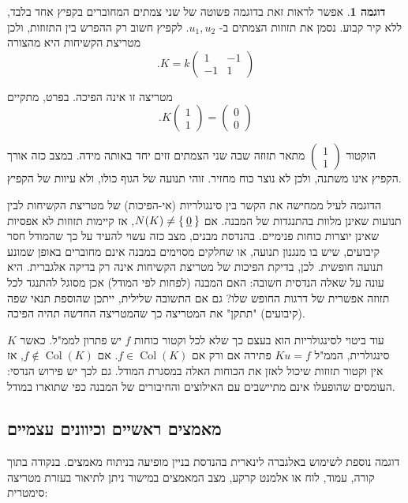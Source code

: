 \documentclass[12pt]{report}
\theoremstyle{plain}
\theoremstyle{definition}
\newtheorem{example}{דוגמה}[chapter]
\newcommand{\0}{\mathbf{0}}
\DeclareMathOperator{\Col}{Col}
\begin{document}
\begin{example}
אפשר לראות זאת בדוגמה פשוטה של שני צמתים המחוברים בקפיץ אחד בלבד, ללא קיר קבוע.
נסמן את תזוזות הצמתים ב-
$u_1,u_2$.
לקפיץ חשוב רק ההפרש בין התזוזות, ולכן מטריצת הקשיחות היא מהצורה
$$
.K =
k
\begin{pmatrix}
1 & -1 \\
-1 & 1
\end{pmatrix}
$$

מטריצה זו אינה הפיכה. בפרט, מתקיים
$$
.K
\begin{pmatrix}
1 \\
1
\end{pmatrix}
=
\begin{pmatrix}
0 \\
0
\end{pmatrix}
$$

הוקטור
$
\begin{pmatrix}
1 \\
1
\end{pmatrix}
$
מתאר תזוזה שבה שני הצמתים זזים יחד באותה מידה.
במצב כזה אורך הקפיץ אינו משתנה, ולכן לא נוצר כוח מחזיר.
זוהי תנועה של הגוף כולו, ולא עיוות של הקפיץ.
\end{example}

הדוגמה לעיל ממחישה את הקשר בין סינגולריות (אי-הפיכות) של מטריצת הקשיחות לבין תנועות שאינן מלוות בהתנגדות של המבנה.
אם
$N(K) \neq \Set{\underline{0}}$,
אז קיימות תזוזות לא אפסיות שאינן יוצרות כוחות פנימיים.
בהנדסת מבנים, מצב כזה עשוי להעיד על כך שהמודל חסר קיבועים, שיש בו מנגנון תנועה, או שחלקים מסוימים במבנה אינם מחוברים באופן שמונע תנועה חופשית. לכן, בדיקת הפיכות של מטריצת הקשיחות אינה רק בדיקה אלגברית. היא עונה על שאלה הנדסית חשובה:
האם המבנה (לפחות לפי המודל) אכן מסוגל להתנגד לכל תזוזה אפשרית של דרגות החופש שלו? גם אם התשובה שלילית, ייתכן שהוספת תנאי שפה (קיבועים) "תתקן" את המטריצה כך שהמטריצה החדשה תהיה הפיכה.

עוד ביטוי לסינגולריות הוא בעצם כך שלא לכל וקטור כוחות
$f$
יש פתרון לממ"ל.
כאשר
$K$
סינגולרית, הממ"ל
$Ku=f$
פתירה אם ורק אם
$f\in\Col(K)$.
אם
$f\notin\Col(K)$,
אז אין וקטור תזוזות שיכול לאזן את הכוחות האלה במסגרת המודל.
גם לכך יש פירוש הנדסי:
העומסים שהופעלו אינם מתיישבים עם האילוצים והחיבורים של המבנה כפי שתוארו במודל.

\subsection*{מאמצים ראשיים וכיוונים עצמיים}

דוגמה נוספת לשימוש באלגברה לינארית בהנדסת בניין מופיעה בניתוח מאמצים.
בנקודה בתוך קורה, עמוד, לוח או אלמנט קרקע, מצב המאמצים במישור ניתן לתיאור בעזרת מטריצה סימטרית:
\end{document}
